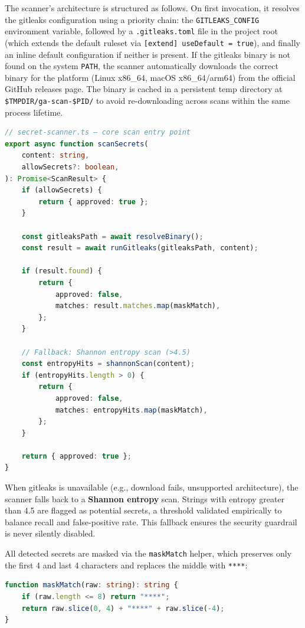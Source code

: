 The scanner's architecture is structured as follows. On first invocation, it resolves the gitleaks configuration using a priority chain: the \texttt{GITLEAKS\_CONFIG} environment variable, followed by a \texttt{.gitleaks.toml} file in the project root (which extends the default ruleset via \texttt{[extend] useDefault = true}), and finally an inline default configuration if neither is present. If the gitleaks binary is not found on the system \texttt{PATH}, the scanner automatically downloads the correct binary for the platform (Linux x86\_64, macOS x86\_64/arm64) from the official GitHub releases page. The binary is cached in a persistent temp directory at \texttt{\$TMPDIR/ga-scan-\$PID/} to avoid re-downloading across scans within the same process lifetime.

\begin{lstlisting}[language=TypeScript]
// secret-scanner.ts — core scan entry point
export async function scanSecrets(
    content: string,
    allowSecrets?: boolean,
): Promise<ScanResult> {
    if (allowSecrets) {
        return { approved: true };
    }

    const gitleaksPath = await resolveBinary();
    const result = await runGitleaks(gitleaksPath, content);

    if (result.found) {
        return {
            approved: false,
            matches: result.matches.map(maskMatch),
        };
    }

    // Fallback: Shannon entropy scan (>4.5)
    const entropyHits = shannonScan(content);
    if (entropyHits.length > 0) {
        return {
            approved: false,
            matches: entropyHits.map(maskMatch),
        };
    }

    return { approved: true };
}
\end{lstlisting}

When gitleaks is unavailable (e.g., download fails, unsupported architecture), the scanner falls back to a \textbf{Shannon entropy} scan. Strings with entropy greater than 4.5 are flagged as potential secrets, a threshold validated empirically to balance recall and false-positive rate. This fallback ensures the security guardrail is never silently disabled.

All detected secrets are masked via the \texttt{maskMatch} helper, which preserves only the first 4 and last 4 characters and replaces the middle with \texttt{****}:

\begin{lstlisting}[language=TypeScript]
function maskMatch(raw: string): string {
    if (raw.length <= 8) return "****";
    return raw.slice(0, 4) + "****" + raw.slice(-4);
}
\end{lstlisting}

